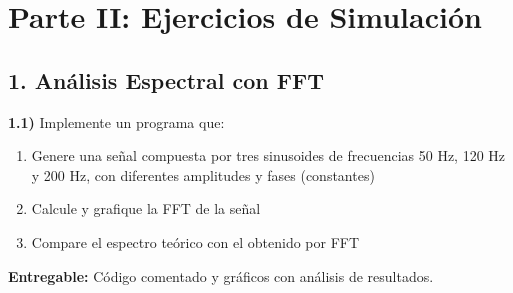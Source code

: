 \section*{Parte II: Ejercicios de Simulación}

\subsection*{1. Análisis Espectral con FFT}

\textbf{1.1)} Implemente un programa que:
\begin{enumerate}[label=\alph*)]
    \item Genere una señal compuesta por tres sinusoides de frecuencias 50 Hz, 120 Hz y 200 Hz, con diferentes amplitudes y fases (constantes)
    \item Calcule y grafique la FFT de la señal
    \item Compare el espectro teórico con el obtenido por FFT
\end{enumerate}

\textbf{Entregable:} Código comentado y gráficos con análisis de resultados.
